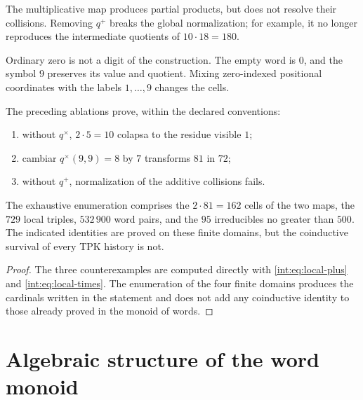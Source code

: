 \begin{definition}
The multiplicative map produces partial products, but does not resolve their collisions.
Removing $q^+$ breaks the global normalization; for example, it no longer reproduces
the intermediate quotients of $10\cdot18=180$.
\end{definition}

\begin{definition}
Ordinary zero is not a digit of the construction. The empty word is
$0$, and the symbol $9$ preserves its value and quotient. Mixing
zero-indexed positional coordinates with the labels $1,\ldots,9$ changes the
cells.
\end{definition}

\begin{proposition}
\label{int:pf84:D10}
The preceding ablations prove, within the declared conventions:
\begin{enumerate}
  \item without \(q^\times\), \(2\cdot5=10\) colapsa to the residue visible \(1\);
  \item cambiar \(q^\times(9,9)=8\) by \(7\) transforms \(81\) in \(72\);
  \item without \(q^+\), normalization of the additive collisions fails.
\end{enumerate}
The exhaustive enumeration comprises the \(2\cdot81=162\) cells of the two
maps, the \(729\) local triples, \(532\,900\) word pairs, and
the \(95\) irreducibles no greater than \(500\). The indicated identities are
proved on these finite domains, but the coinductive survival
of every TPK history is not.
\end{proposition}

\begin{proof}
The three counterexamples are computed directly with
\eqref{int:eq:local-plus} and \eqref{int:eq:local-times}. The enumeration of the four
finite domains produces the cardinals written in the statement and does not add
any coinductive identity to those already proved in the monoid
of words.
\end{proof}

\section{Algebraic structure of the word monoid}

